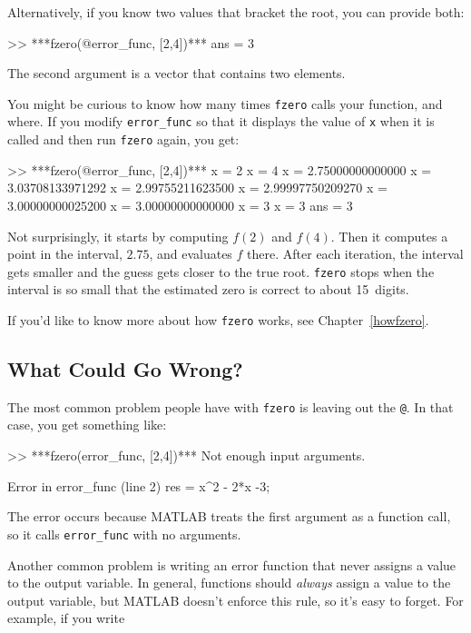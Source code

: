Alternatively, if you know two values that bracket the root,
you can provide both:

\begin{code}
>> ***fzero(@error_func, [2,4])***
ans = 3
\end{code}

The second argument is a vector that contains two elements.  


You might be curious to know how many times \lstinline{fzero} calls your
function, and where.  If you modify \lstinline{error_func} so that it displays
the value of \lstinline{x} when it is called and then run \lstinline{fzero}
again, you get:

\begin{code}
>> ***fzero(@error_func, [2,4])***
x = 2
x = 4
x = 2.75000000000000
x = 3.03708133971292
x = 2.99755211623500
x = 2.99997750209270
x = 3.00000000025200
x = 3.00000000000000
x = 3
x = 3
ans = 3
\end{code}

Not surprisingly, it starts by computing $f(2)$ and $f(4)$.  Then it computes a point in the interval, $2.75$, and evaluates $f$ there.  After each iteration, the interval gets smaller and the guess gets closer to the true root.
\lstinline{fzero} stops when the interval is so small that the estimated
zero is correct to about 15~digits.
 
If you'd like to know more about how \lstinline{fzero} works, see Chapter~\ref{howfzero}.


\subsection{What Could Go Wrong?}

The most common problem people have with \lstinline{fzero} is leaving
out the \lstinline{@}.  In that case, you get something like:

\begin{code}
>> ***fzero(error_func, [2,4])***
Not enough input arguments.

Error in error_func (line 2)
    res = x^2 - 2*x -3;
\end{code}

The error occurs because MATLAB treats the first argument as a function call, so it calls \lstinline{error_func} with no arguments.


Another common problem is writing an error function that never
assigns a value to the output variable.  In general, functions should
{\em always} assign a value to the output variable, but MATLAB doesn't
enforce this rule, so it's easy to forget.  For example, if you
write

